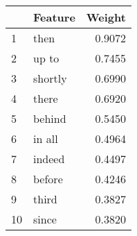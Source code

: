 \begin{tabular}{llr}
\toprule
{} &  Feature &  Weight \\
\midrule
1  &     then &  0.9072 \\
2  &    up to &  0.7455 \\
3  &  shortly &  0.6990 \\
4  &    there &  0.6920 \\
5  &   behind &  0.5450 \\
6  &   in all &  0.4964 \\
7  &   indeed &  0.4497 \\
8  &   before &  0.4246 \\
9  &    third &  0.3827 \\
10 &    since &  0.3820 \\
\bottomrule
\end{tabular}

